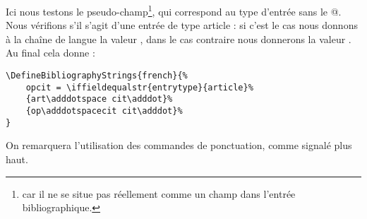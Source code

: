 Ici nous testons le pseudo-champ\footnote{ car il ne se situe pas réellement comme un champ dans l'entrée bibliographique.}, qui correspond au type d'entrée sans le @. Nous vérifions  s'il s'agit d'une entrée de type article : si c'est le cas nous donnons à la chaîne de langue la valeur  ,  dans le cas contraire nous donnerons la valeur .
Au final cela donne : 

\begin{verbatim}
\DefineBibliographyStrings{french}{%
	opcit = \iffieldequalstr{entrytype}{article}%
	{art\adddotspace cit\adddot}%
	{op\adddotspacecit cit\adddot}%
}
\end{verbatim}

On remarquera l'utilisation des commandes de ponctuation, comme signalé plus haut.


	

